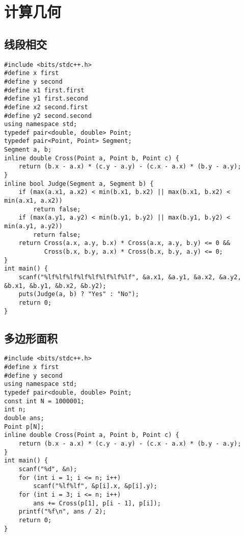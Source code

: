 \documentclass[a4paper]{article}
\begin{document}
\section{计算几何}
\subsection{线段相交}
\begin{lstlisting}
#include <bits/stdc++.h>
#define x first
#define y second
#define x1 first.first
#define y1 first.second
#define x2 second.first
#define y2 second.second
using namespace std;
typedef pair<double, double> Point;
typedef pair<Point, Point> Segment;
Segment a, b;
inline double Cross(Point a, Point b, Point c) {
    return (b.x - a.x) * (c.y - a.y) - (c.x - a.x) * (b.y - a.y);
}
inline bool Judge(Segment a, Segment b) {
    if (max(a.x1, a.x2) < min(b.x1, b.x2) || max(b.x1, b.x2) < min(a.x1, a.x2))
        return false;
    if (max(a.y1, a.y2) < min(b.y1, b.y2) || max(b.y1, b.y2) < min(a.y1, a.y2))
        return false;
    return Cross(a.x, a.y, b.x) * Cross(a.x, a.y, b.y) <= 0 &&
           Cross(b.x, b.y, a.x) * Cross(b.x, b.y, a.y) <= 0;
}
int main() {
    scanf("%lf%lf%lf%lf%lf%lf%lf%lf", &a.x1, &a.y1, &a.x2, &a.y2, &b.x1, &b.y1, &b.x2, &b.y2);
    puts(Judge(a, b) ? "Yes" : "No");
    return 0;
}

\end{lstlisting}
\subsection{多边形面积}
\begin{lstlisting}
#include <bits/stdc++.h>
#define x first
#define y second
using namespace std;
typedef pair<double, double> Point;
const int N = 1000001;
int n;
double ans;
Point p[N];
inline double Cross(Point a, Point b, Point c) {
    return (b.x - a.x) * (c.y - a.y) - (c.x - a.x) * (b.y - a.y);
}
int main() {
    scanf("%d", &n);
    for (int i = 1; i <= n; i++)
        scanf("%lf%lf", &p[i].x, &p[i].y);
    for (int i = 3; i <= n; i++)
        ans += Cross(p[1], p[i - 1], p[i]);
    printf("%f\n", ans / 2);
    return 0;
}
\end{lstlisting}
\end{document}

